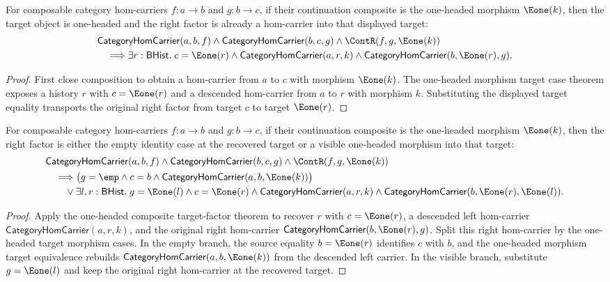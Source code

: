 \begin{theorem}
\label{thm:category-comp-e1-morphism-target-factor}
For composable category hom-carriers $f:a\to b$ and $g:b\to c$, if their
continuation composite is the one-headed morphism $\Eone(k)$, then the target
object is one-headed and the right factor is already a hom-carrier into that
displayed target:
$$
\begin{aligned}
&\mathsf{CategoryHomCarrier}(a,b,f)\land
\mathsf{CategoryHomCarrier}(b,c,g)\land
\ContR(f,g,\Eone(k))\\
&\quad\Longrightarrow
\exists r:\mathsf{BHist}.\;
c=\Eone(r)\land
\mathsf{CategoryHomCarrier}(a,r,k)\land
\mathsf{CategoryHomCarrier}(b,\Eone(r),g).
\end{aligned}
$$
\end{theorem}
\begin{proof}
First close composition to obtain a hom-carrier from $a$ to $c$ with morphism
$\Eone(k)$. The one-headed morphism target case theorem exposes a history $r$
with $c=\Eone(r)$ and a descended hom-carrier from $a$ to $r$ with morphism
$k$. Substituting the displayed target equality transports the original right
factor from target $c$ to target $\Eone(r)$.
\end{proof}

\begin{theorem}
\label{thm:category-comp-e1-morphism-right-factor-cases}
For composable category hom-carriers $f:a\to b$ and $g:b\to c$, if their
continuation composite is the one-headed morphism $\Eone(k)$, then the right
factor is either the empty identity case at the recovered target or a visible
one-headed morphism into that target:
$$
\begin{aligned}
&\mathsf{CategoryHomCarrier}(a,b,f)\land
\mathsf{CategoryHomCarrier}(b,c,g)\land
\ContR(f,g,\Eone(k))\\
&\quad\Longrightarrow
\bigl(g=\emp\land c=b\land
\mathsf{CategoryHomCarrier}(a,b,\Eone(k))\bigr)\\
&\qquad\lor
\exists l,r:\mathsf{BHist}.\;
g=\Eone(l)\land c=\Eone(r)\land
\mathsf{CategoryHomCarrier}(a,r,k)\land
\mathsf{CategoryHomCarrier}(b,\Eone(r),\Eone(l)).
\end{aligned}
$$
\end{theorem}
\begin{proof}
Apply the one-headed composite target-factor theorem to recover $r$ with
$c=\Eone(r)$, a descended left hom-carrier
$\mathsf{CategoryHomCarrier}(a,r,k)$, and the original right hom-carrier
$\mathsf{CategoryHomCarrier}(b,\Eone(r),g)$. Split this right hom-carrier by
the one-headed target morphism cases. In the empty branch, the source equality
$b=\Eone(r)$ identifies $c$ with $b$, and the one-headed morphism target
equivalence rebuilds $\mathsf{CategoryHomCarrier}(a,b,\Eone(k))$ from the
descended left carrier. In the visible branch, substitute $g=\Eone(l)$ and keep
the original right hom-carrier at the recovered target.
\end{proof}

